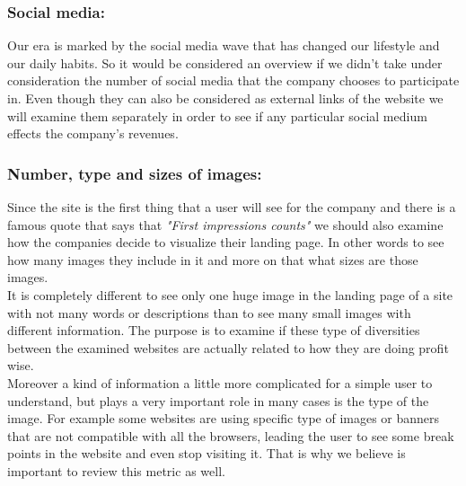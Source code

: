 \documentclass{article}
\begin{document}
\subsubsection{Social media:}\label{M:Social media}
Our era is marked by the social media wave that has changed our lifestyle and our daily habits. So it would be considered an overview if we didn't take under consideration the number of social media that the company chooses to participate in. Even though they can also be considered as external links of the website we will examine them separately in order to see if any particular social medium effects the company's revenues.
\subsubsection{Number, type and sizes of images:}\label{M:N,T,S Imgs}
Since the site is the first thing that a user will see for the company and there is a famous quote that says that \textit{"First impressions counts"} we should also examine how the companies decide to visualize their landing page. In other words to see how many images they include in it and more on that what sizes are those images.\\ It is completely different to see only one huge image in the landing page of a site with not many words or descriptions than to see many small images with different information. The purpose is to examine if these type of diversities between the examined websites are actually related to how they are doing profit wise.\\ Moreover a kind of information a little more complicated for a simple user to understand, but plays a very important role in many cases is the type of the image. For example some websites are using specific type of images or banners that are not compatible with all the browsers, leading the user to see some break points in the website and even stop visiting it. That is why we believe is important to review this metric as well.
\end{document}
